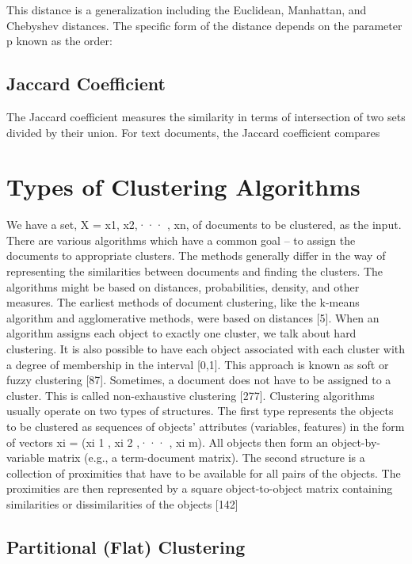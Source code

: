 \documentclass[11pt,openany,executivepaper]{book}
\begin{document}
This distance is a generalization including the Euclidean, Manhattan, and Chebyshev distances. The specific form of the distance depends on the parameter p
known as the order:

\subsection{Jaccard Coefficient}

The Jaccard coefficient measures the similarity in terms of intersection of two
sets divided by their union. For text documents, the Jaccard coefficient compares

\section{Types of Clustering Algorithms}

We have a set, X = {x1, x2,··· , xn}, of documents to be clustered, as the input. There are various algorithms which have a common goal – to assign the
documents to appropriate clusters. The methods generally differ in the way of
representing the similarities between documents and finding the clusters. The algorithms might be based on distances, probabilities, density, and other measures.
The earliest methods of document clustering, like the k-means algorithm and
agglomerative methods, were based on distances [5].
When an algorithm assigns each object to exactly one cluster, we talk about
hard clustering. It is also possible to have each object associated with each cluster
with a degree of membership in the interval [0,1]. This approach is known as soft
or fuzzy clustering [87]. Sometimes, a document does not have to be assigned to
a cluster. This is called non-exhaustive clustering [277].
Clustering algorithms usually operate on two types of structures. The first
type represents the objects to be clustered as sequences of objects’ attributes
(variables, features) in the form of vectors xi = (xi
1
, xi
2
,··· , xi
m). All objects then
form an object-by-variable matrix (e.g., a term-document matrix). The second
structure is a collection of proximities that have to be available for all pairs of the
objects. The proximities are then represented by a square object-to-object matrix
containing similarities or dissimilarities of the objects [142]

\subsection{Partitional (Flat) Clustering}
\end{document}
